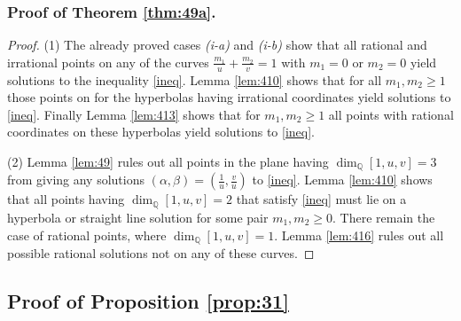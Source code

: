 \documentclass[12pt,letterpaper, reqno]{amsart}
\theoremstyle{definition}
\theoremstyle{remark}
\newcommand{\QQ}{\mathbb{Q}}
\begin{document}
\subsubsection{ {\bf Proof of Theorem \ref{thm:49a}.}}\label{sec445}


\begin{proof}
(1) The already proved cases {\it (i-a)} and {\it (i-b)} show that all rational and irrational points
on any of the curves 
$\frac{m_1}{u} + \frac{m_2}{v} =1$  with $m_1=0$ or
$m_2=0$  yield solutions to the inequality \eqref{ineq}. 
Lemma  \ref{lem:410} shows that for all $m_1, m_2 \ge 1$ 
those  points on  for the hyperbolas 
having irrational coordinates yield solutions to \eqref{ineq}.
Finally Lemma \ref{lem:413}  shows that for $m_1, m_2 \ge 1$ 
all points with rational coordinates on these hyperbolas  
 yield solutions to \eqref{ineq}.

(2) Lemma \ref{lem:49} rules out all points in the plane having 
$\dim_{\QQ} [1, u, v]=3$ from giving any solutions $(\alpha, \beta)= (\frac{1}{u}, \frac{v}{u})$  to \eqref{ineq}.
Lemma \ref{lem:410} shows that all points having $\dim_{\QQ} [1, u, v]=2$
that satisfy \eqref{ineq} must lie on a hyperbola or straight line solution for
some pair $m_1, m_2 \ge 0$. There remain the case of rational points,
where $\dim_{\QQ} [1, u, v]=1$.
Lemma \ref{lem:416} rules out all possible 
rational solutions not on any of these curves.
\end{proof} 

%
%
\subsection{Proof of  Proposition \ref{prop:31}}\label{sec:45}
\end{document}
